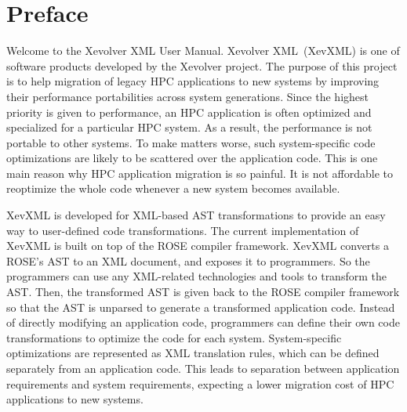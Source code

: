 
\chapter*{Preface}



Welcome to the Xevolver XML User Manual.  Xevolver XML~(XevXML) is one
of software products developed by the Xevolver project.  The purpose of
this project is to help migration of legacy HPC applications to new
systems by improving their performance portabilities across system
generations.  Since the highest priority is given to performance, an HPC
application is often optimized and specialized for a particular HPC
system. As a result, the performance is not portable to other systems.
To make matters worse, such system-specific code optimizations are
likely to be scattered over the application code. This is one main
reason why HPC application migration is so painful. It is not affordable
to reoptimize the whole code whenever a new system becomes available.



XevXML is developed for XML-based AST transformations to provide an easy
way to user-defined code transformations.  The current implementation of
XevXML is built on top of the ROSE compiler framework. XevXML converts a
ROSE's AST to an XML document, and exposes it to programmers. So the
programmers can use any XML-related technologies and tools to transform
the AST. Then, the transformed AST is given back to the ROSE compiler
framework so that the AST is unparsed to generate a transformed
application code.  Instead of directly modifying an application code,
programmers can define their own code transformations to optimize the
code for each system.  System-specific optimizations are represented as
XML translation rules, which can be defined separately from an
application code.  This leads to separation between application
requirements and system requirements, expecting a lower migration cost
of HPC applications to new systems.

